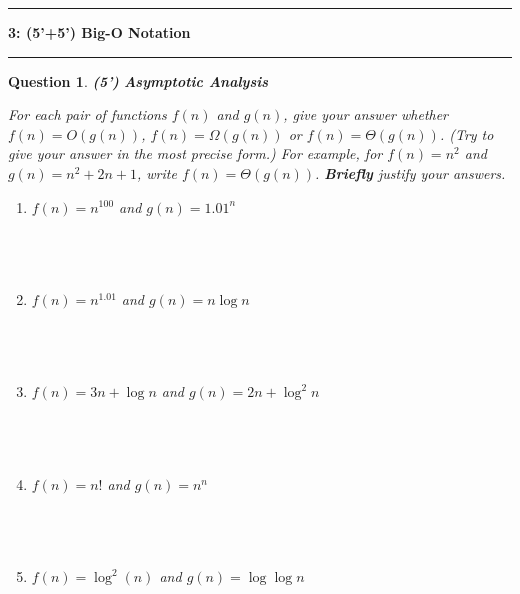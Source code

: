 \documentclass[10.5pt]{article}
\newcommand\question[2]{\vspace{.25in}\hrule\textbf{#1: #2}\vspace{.5em}\hrule\vspace{.10in}}
\newtheorem{Q}{Question}
\begin{document}
\question{3}{(5'+5') Big-O Notation}
\begin{Q}
 \textbf{(5')} \textbf{Asymptotic Analysis}
 
For each pair of functions $f(n)$ and $g(n)$, give your answer whether $f(n) = O(g(n))$, $f(n) = \Omega(g(n))$ or $f(n) = \Theta(g(n))$.  (Try to give your answer in the most precise form.) For example, for $f(n) = n^2$ and $g(n) = n^2 + 2n + 1$, write $f(n) = \Theta(g(n))$. \textbf{Briefly} justify your answers.
\begin{enumerate}
    \item $f(n) = n^{100}$ and $g(n) = {1.01}^n$
    \\
    \\
    \\
    \\
    \item $f(n) = n^{1.01}$ and $g(n) = n\log n$
    \\
    \\
    \\
    \\
    \item $f(n) = 3n + \log n$ and $g(n) = 2n + {\log}^2 n$ 
    \\
    \\
    \\
    \\
    \item $f(n) = n!$ and $g(n) = n^n$
    \\
    \\
    \\
    \\
    \item $f(n) = {\log}^2(n)$ and $g(n) = \log \log n$ 
    \\
    \\
    \\
    \\
\end{enumerate}
\end{Q}
\pagebreak
\end{document}
